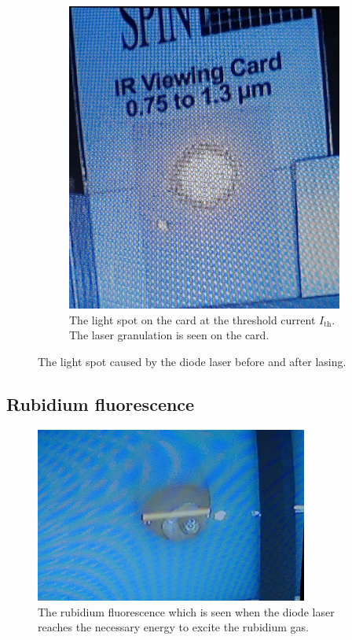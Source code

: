 \begin{figure}[ht]
\begin{subfigure}{0.49\textwidth}
        \includegraphics[width=\textwidth]{bilder/laser_after.jpg}
        \caption{The light spot on the card at the threshold current $I_\text{th}$. The laser granulation is seen on the card. \cite{anleitungHeNe}}
        \label{fig:laser_after}
    \end{subfigure}
    \caption{The light spot caused by the diode laser before and after lasing.}
\end{figure}


\subsection{Rubidium fluorescence}

\begin{figure}[ht]
    \center
    \includegraphics[width=0.8\textwidth]{bilder/fluorescence.jpg}
    \caption{The rubidium fluorescence which is seen when the diode laser reaches the necessary energy to excite the rubidium gas. \cite{anleitungHeNe}}
    \label{fig:fluorescence}
\end{figure}


